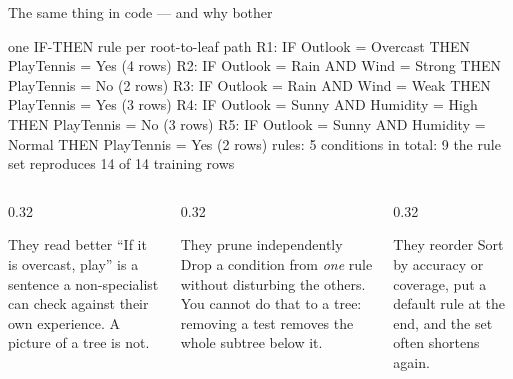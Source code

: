 \documentclass[aspectratio=169]{beamer}
\begin{document}
\begin{frame}[fragile,shrink=8]{The same thing in code --- and why bother}
\begin{outblk}
one IF-THEN rule per root-to-leaf path
R1: IF Outlook = Overcast THEN PlayTennis = Yes      (4 rows)
R2: IF Outlook = Rain AND Wind = Strong THEN PlayTennis = No      (2 rows)
R3: IF Outlook = Rain AND Wind = Weak THEN PlayTennis = Yes      (3 rows)
R4: IF Outlook = Sunny AND Humidity = High THEN PlayTennis = No      (3 rows)
R5: IF Outlook = Sunny AND Humidity = Normal THEN PlayTennis = Yes      (2 rows)
rules: 5   conditions in total: 9
the rule set reproduces 14 of 14 training rows
\end{outblk}
\begin{columns}[T]
  \begin{column}{0.32\textwidth}
    \begin{block}{They read better}
      \scriptsize ``If it is overcast, play'' is a sentence a non-specialist
      can check against their own experience. A picture of a tree is not.
    \end{block}
  \end{column}
  \begin{column}{0.32\textwidth}
    \begin{block}{They prune independently}
      \scriptsize Drop a condition from \emph{one} rule without disturbing the
      others. You cannot do that to a tree: removing a test removes the whole
      subtree below it.
    \end{block}
  \end{column}
  \begin{column}{0.32\textwidth}
    \begin{block}{They reorder}
      \scriptsize Sort by accuracy or coverage, put a default rule at the end,
      and the set often shortens again.
    \end{block}
  \end{column}
\end{columns}
\end{frame}
\end{document}
